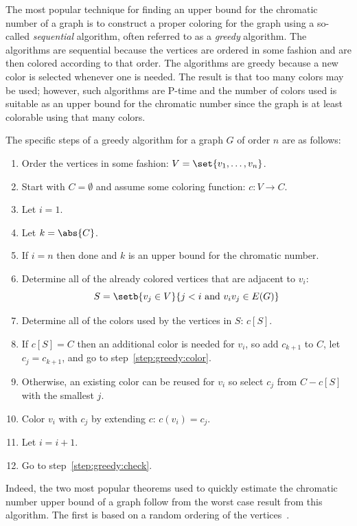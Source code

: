 The most popular technique for finding an upper bound for the chromatic number of a graph is to construct a proper
coloring for the graph using a so-called \emph{sequential} algorithm, often referred to as a \emph{greedy}
algorithm.  The algorithms are sequential because the vertices are ordered in some fashion and are then colored
according to that order.  The algorithms are greedy because a new color is selected whenever one is needed.  The
result is that too many colors may be used; however, such algorithms are P-time and the number of colors used is
suitable as an upper bound for the chromatic number since the graph is at least colorable using that many colors.

The specific steps of a greedy algorithm for a graph \(G\) of order \(n\) are as follows:
\begin{enumerate}
\item Order the vertices in some fashion: \(V=\set{v_1,\ldots,v_n}\).
\item Start with \(C=\emptyset\) and assume some coloring function: \(c:V\to C\).
\item Let \(i=1\).
\item\label{step:greedy:check} Let \(k=\abs{C}\).
\item If \(i=n\) then done and \(k\) is an upper bound for the chromatic number.
\item Determine all of the already colored vertices that are adjacent to \(v_i\):
  \[S=\setb{v_j\in V}{j<i\ \text{and}\ v_iv_j\in E(G)}\]
\item Determine all of the colors used by the vertices in \(S\): \(c[S]\).
\item If \(c[S]=C\) then an additional color is needed for \(v_i\), so add \(c_{k+1}\) to \(C\), let
  \(c_j=c_{k+1}\), and go to step~\ref{step:greedy:color}.
\item Otherwise, an existing color can be reused for \(v_i\) so select \(c_j\) from \(C-c[S]\) with the smallest
  \(j\).
\item\label{step:greedy:color} Color \(v_i\) with \(c_j\) by extending \(c\): \(c(v_i)=c_j\).
\item Let \(i=i+1\).
\item Go to step~\ref{step:greedy:check}.
\end{enumerate}

Indeed, the two most popular theorems used to quickly estimate the chromatic number upper bound of a graph follow
from the worst case result from this algorithm.  The first is based on a random ordering of the
vertices~\cite{chartrand}.

